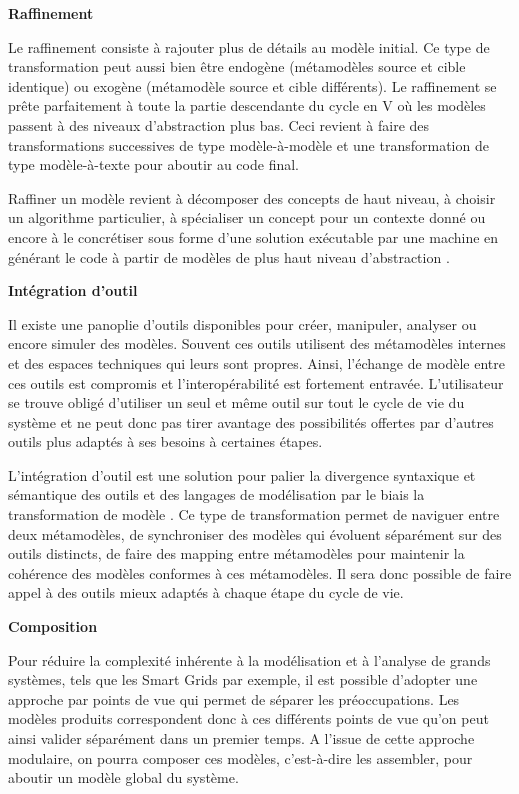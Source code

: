 \begin{description}

\item \textbf{Raffinement}

Le raffinement consiste à rajouter plus de détails au modèle initial. Ce type de 
transformation peut aussi bien être endogène (métamodèles source et cible 
identique) ou exogène (métamodèle source et cible différents). Le raffinement se 
prête parfaitement à toute la partie descendante du cycle en V où les modèles 
passent à des niveaux d'abstraction plus bas. Ceci revient à faire des 
transformations successives de type modèle-à-modèle et une transformation de 
type modèle-à-texte pour aboutir au code final.

Raffiner un modèle revient à décomposer des concepts de haut niveau, à choisir 
un algorithme particulier, à spécialiser un concept pour un contexte donné ou 
encore à le concrétiser sous forme d'une solution exécutable par une machine en 
générant le code à partir de modèles de plus haut niveau d'abstraction 
\cite{czarnecki2000intentional}. 

\item \textbf{Intégration d'outil}

Il existe une panoplie d'outils disponibles pour créer, manipuler, analyser ou 
encore simuler des modèles. Souvent ces outils utilisent des métamodèles 
internes et des espaces techniques qui leurs sont propres. Ainsi, l'échange de 
modèle entre ces outils est compromis et l'interopérabilité est fortement 
entravée. L'utilisateur se trouve obligé d'utiliser un seul et même outil sur 
tout le cycle de vie du système et ne peut donc pas tirer avantage des 
possibilités offertes par d'autres outils plus adaptés à ses besoins à certaines 
étapes.

L'intégration d'outil est une solution pour palier la divergence syntaxique et 
sémantique des outils et des langages de modélisation par le biais la 
transformation de modèle \cite{tratt2005model}. Ce type de transformation permet 
de naviguer entre deux métamodèles, de synchroniser des modèles qui évoluent 
séparément sur des outils distincts, de faire des mapping entre métamodèles pour 
maintenir la cohérence des modèles conformes à ces métamodèles. Il sera donc 
possible de faire appel à des outils mieux adaptés à chaque étape du cycle de 
vie.

\item \textbf{Composition}

Pour réduire la complexité inhérente à la modélisation et à l'analyse de grands 
systèmes, tels que les Smart Grids par exemple, il est possible d'adopter une 
approche par points de vue qui permet de séparer les préoccupations. Les modèles 
produits correspondent donc à ces différents points de vue qu'on peut ainsi 
valider séparément dans un premier temps. A l'issue de cette approche modulaire, 
on pourra composer ces modèles, c'est-à-dire les assembler, pour aboutir un 
modèle global du système.


\end{description}
